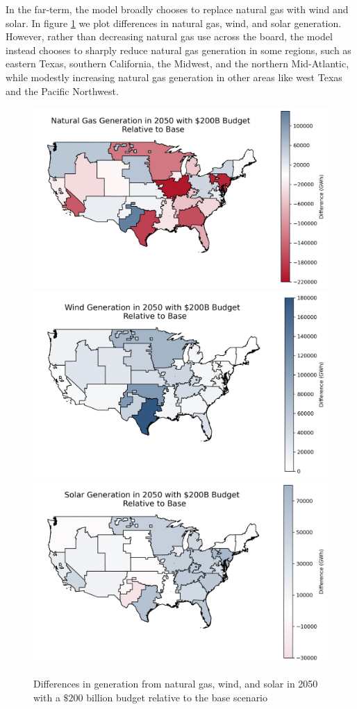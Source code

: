 \documentclass[a4paper]{article}
\theoremstyle{definition}
\theoremstyle{plain}
\begin{document}
In the far-term, the model broadly chooses to replace natural gas with wind and solar. In figure \ref{2050Generation} we plot differences in natural gas, wind, and solar generation. However, rather than decreasing natural gas use across the board, the model instead chooses to sharply reduce natural gas generation in some regions, such as eastern Texas, southern California, the Midwest, and the northern Mid-Atlantic, while modestly increasing natural gas generation in other areas like west Texas and the Pacific Northwest.

\begin{figure}
    \centering
    \includegraphics[width=0.8\linewidth]{Figures/EndogenousPaper/naturalgas_generation_map.png}
    \includegraphics[width=0.8\linewidth]{Figures/EndogenousPaper/wind_generation_map.png}
    \includegraphics[width=0.8\linewidth]{Figures/EndogenousPaper/solar_generation_map.png}
    \caption{Differences in generation from natural gas, wind, and solar in 2050 with a $\$200$ billion budget relative to the base scenario}
    \label{2050Generation}
\end{figure}
\end{document}

